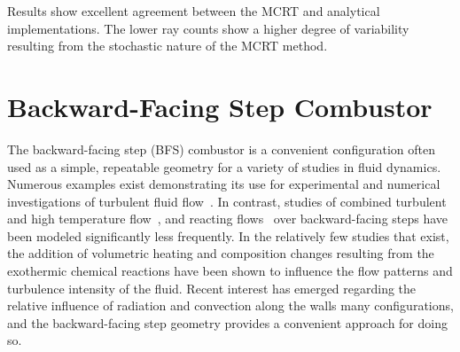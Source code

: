 



Results show excellent agreement between the MCRT and analytical implementations. 
The lower ray counts show a higher degree of variability resulting from the stochastic nature of the MCRT method. 


\section{Backward-Facing Step Combustor}
The backward-facing step (BFS) combustor is a convenient configuration often used as a simple, repeatable geometry for a variety of studies in fluid dynamics.
Numerous examples exist demonstrating its use for experimental and numerical investigations of turbulent fluid flow~\cite{Armaly1983ExperimentalFlow,Neto1993AStep,Jovic1994Backward-facing5000,Le1997DirectStep}. In contrast, studies of combined turbulent and high temperature flow~\cite{Niemann2016Buoyancy-affectedNumber,Xie2017GeometrySteps}, and reacting flows~\cite{Pouech2021PremixedStep} over backward-facing steps have been modeled significantly less frequently.
In the relatively few studies that exist, the addition of volumetric heating and composition changes resulting from the exothermic chemical reactions have been shown to influence the flow patterns and turbulence intensity of the fluid. 
Recent interest has emerged regarding the relative influence of radiation and convection along the walls many configurations, and the backward-facing step geometry provides a convenient approach for doing so.

